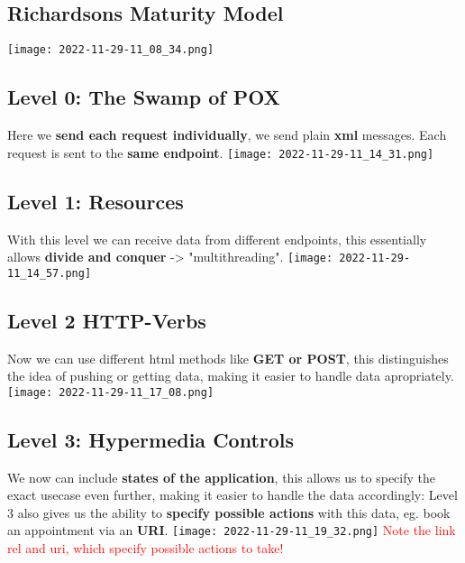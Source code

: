 \documentclass[main.tex,fontsize=6pt,paper=a4,paper=landscape,DIV=calc,]{scrartcl}
\begin{document}
\begin{multicols*}{4}
\subsection{Richardsons Maturity Model}  
\texttt{[image: 2022-11-29-11\_08\_34.png]}

\subsection{Level 0: The Swamp of POX}  
Here we \textbf{send each request individually}, we send plain \textbf{xml} messages.\newline
Each request is sent to the \textbf{same endpoint}. 
\texttt{[image: 2022-11-29-11\_14\_31.png]}


\subsection{Level 1: Resources}  
With this level we can receive data from different endpoints, this essentially allows \textbf{divide and conquer} -> "multithreading".\newline 
\texttt{[image: 2022-11-29-11\_14\_57.png]}

\subsection{Level 2 HTTP-Verbs}  
Now we can use different html methods like \textbf{GET or POST}, this distinguishes the idea of pushing or getting data, making it easier to handle data apropriately. \newline
\texttt{[image: 2022-11-29-11\_17\_08.png]}

\subsection{Level 3: Hypermedia Controls}  
We now can include \textbf{states of the application}, this allows us to specify the exact usecase even further, making it easier to handle the data accordingly:\newline
Level 3 also gives us the ability to \textbf{specify possible actions} with this data, eg. book an appointment via an \textbf{URI}.
\texttt{[image: 2022-11-29-11\_19\_32.png]} \newline
\textcolor{red}{Note the link rel and uri, which specify possible actions to take!}


\end{multicols*}
\end{document}
